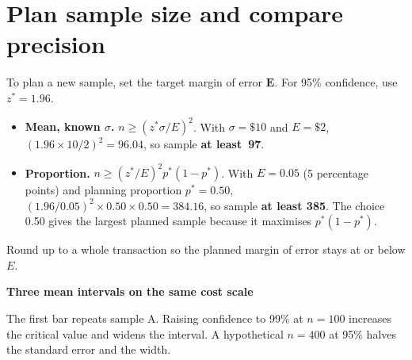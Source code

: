 \section{Plan sample size and compare precision}

To plan a new sample, set the target margin of error \(\boldsymbol{E}\). For 95\% confidence, use \(z^*=1.96\).
\begin{itemize}
  \item \textbf{Mean, known \(\sigma\).} \(n\ge (z^*\sigma/E)^2\). With \(\sigma=\$10\) and \(E=\$2\), \((1.96\times 10/2)^2=96.04\), so sample \textbf{at least~97}.
  \item \textbf{Proportion.} \(n\ge (z^*/E)^2 p^*(1-p^*)\). With \(E=0.05\) (5 percentage points) and planning proportion \(p^*=0.50\), \((1.96/0.05)^2\times 0.50\times 0.50=384.16\), so sample \textbf{at least 385}. The choice 0.50 gives the largest planned sample because it maximises \(p^*(1-p^*)\).
\end{itemize}
Round up to a whole transaction so the planned margin of error stays at or below \(E\).


\noindent
\begin{minipage}[c]{0.605\linewidth}
  \centering
  \small\textbf{Three mean intervals on the same cost scale}\par\smallskip
\end{minipage}\hfill
\begin{minipage}[c]{0.38\linewidth}
  \raggedright\small
  The first bar repeats sample A. Raising confidence to 99\% at \(n=100\) increases the critical value and widens the interval. A hypothetical \(n=400\) at 95\% halves the standard error and the width.
\end{minipage}

